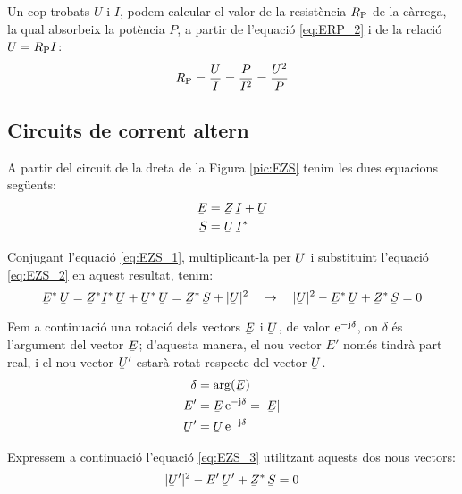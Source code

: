 Un cop trobats $U$ i $I$, podem calcular el valor de la resist\`{e}ncia
$R_\mathrm{P}$ de la c\`{a}rrega, la qual absorbeix la pot\`{e}ncia $P$, a
partir de l'equaci\'{o} \eqref{eq:ERP_2} i de la relaci\'{o} $U =R_\mathrm{P}
I$:
\begin{equation}
   R_\mathrm{P} = \frac{U}{I} = \frac{P}{I^2} = \frac{U^2}{P}
\end{equation}

\subsection{Circuits de corrent altern}

A partir del circuit de la dreta de la Figura \vref{pic:EZS} tenim les dues equacions seg\"{u}ents:
\begin{align}
   \cmplx{E} &= \cmplx{Z} \, \cmplx{I} + \cmplx{U} \label{eq:EZS_1} \\
   \cmplx{S} &= \cmplx{U} \, \cmplx{I}^*           \label{eq:EZS_2}
\end{align}

Conjugant l'equaci\'{o} \eqref{eq:EZS_1}, multiplicant-la per $\cmplx{U}$ i substituint l'equaci\'{o} \eqref{eq:EZS_2} en aquest resultat, tenim:
\begin{equation}
   \cmplx{E}^* \, \cmplx{U} = \cmplx{Z}^* \cmplx{I}^* \, \cmplx{U} + \cmplx{U}^* \, \cmplx{U} =
   \cmplx{Z}^* \, \cmplx{S} + |\cmplx{U}|^2 \quad \rightarrow \quad
   |\cmplx{U}|^2 - \cmplx{E}^* \, \cmplx{U} + \cmplx{Z}^* \, \cmplx{S} = 0
   \label{eq:EZS_3}
\end{equation}

Fem a continuaci\'{o} una rotaci\'{o} dels vectors $\cmplx{E}$ i $\cmplx{U}$, de valor
$\mathrm{e}^{-\mathrm{j}\delta}$, on $\delta$ \'{e}s l'argument del vector $\cmplx{E}$; d'aquesta manera, el
nou vector $E'$ nom\'{e}s tindr\`{a} part real, i el nou vector $\cmplx{U}'$ estar\`{a} rotat respecte
del vector $\cmplx{U}$.
\begin{align}
   \delta &= \arg(\cmplx{E}) \label{eq:EZS_9} \\
   E' &= \cmplx{E} \, \eu^{-\ju\delta} = |\cmplx{E}|  \label{eq:EZS_4} \\
   \cmplx{U}' &= \cmplx{U} \, \eu^{-\ju\delta}   \label{eq:EZS_5}
\end{align}

Expressem a continuaci\'{o} l'equaci\'{o} \eqref{eq:EZS_3} utilitzant
aquests dos nous vectors:
\begin{equation}
   |\cmplx{U}'|^2 - E' \, \cmplx{U}' + \cmplx{Z}^* \, \cmplx{S} = 0 \label{eq:EZS_6}
\end{equation}

